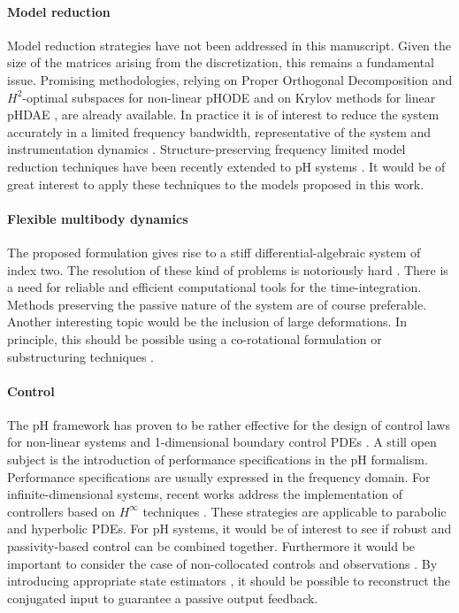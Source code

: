 \paragraph{Model reduction}
Model reduction strategies have not been addressed in this manuscript. Given the size of the matrices arising from the discretization, this remains a fundamental issue. Promising methodologies, relying on Proper Orthogonal Decomposition and $H^2$-optimal subspaces for non-linear pHODE \cite{chaturantabut2016} and on Krylov methods for linear pHDAE \cite{egger2018}, are already available.  In practice it is of interest to reduce the system accurately in a limited frequency bandwidth, representative of the system and instrumentation dynamics \cite{vuillemin2014frequency}. Structure-preserving frequency limited model reduction techniques have been recently extended to pH systems \cite{xu2020sp}. It would be of great interest to apply these techniques to the models proposed in this work.

\paragraph{Flexible multibody dynamics}
The proposed formulation gives rise to a stiff differential-algebraic system of index two. The resolution of these kind of problems is notoriously hard \cite{brenan1995dae}. There is a need for reliable and efficient computational tools for the time-integration. Methods preserving the passive nature of the system are of course preferable. \\ Another interesting topic would be the inclusion of large deformations. In principle, this should be possible using a co-rotational formulation or substructuring techniques \cite{wu1988substructuring}.

\paragraph{Control}
The pH framework has proven to be rather effective for the design of control laws for non-linear systems \cite{ortega2004survey} and 1-dimensional boundary control PDEs \cite{macchelli2020exponential}. A still open subject is the introduction of performance specifications in the pH formalism. Performance specifications are usually expressed in the frequency domain. For infinite-dimensional systems, recent works address the implementation of controllers based on $H^\infty$ techniques \cite{apkarian2018structured,apkarian2020bd}. These strategies are applicable to parabolic and hyperbolic PDEs. For pH systems, it would be of interest to see if robust and passivity-based control can be combined together.  Furthermore it would be important to consider the case of non-collocated controls and observations \cite{cardoso2016}. By introducing appropriate state estimators \cite{yaghmaei2019}, it should be possible to reconstruct the conjugated input to guarantee a passive output feedback.


